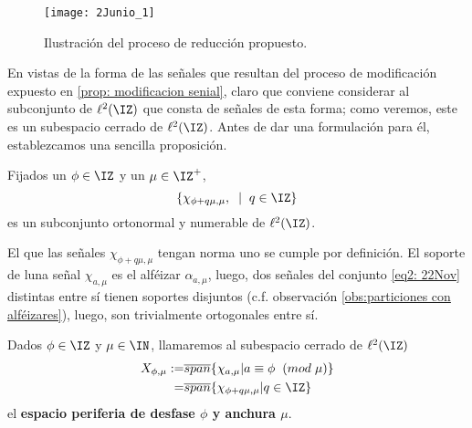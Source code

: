 \begin{figure}[H]
	\centering
	\texttt{[image: 2Junio\_1]}
	\caption{Ilustración del proceso de reducción propuesto.
	}
\end{figure}

En vistas de la forma de las señales
que resultan del proceso 
de modificación expuesto en 
\ref{prop: modificacion senial}, claro que conviene
considerar al subconjunto de $\ell^{2}(\IZ)$
que consta de señales de esta forma;
como veremos, 
este es un subespacio cerrado 
de $\ell^{2}(\IZ)$.
Antes de dar una formulación para él, establezcamos
una sencilla proposición.

\begin{prop}
\label{prop: las chi con dominio particion por ventanas forman un sist. ort.}
Fijados un 
$\phi \in \IZ$ y un 
$\mu \in \IZ^{+}$,
\begin{equation}
\label{eq2: 22Nov}
\{ \chi_{\phi + q\mu, \mu}, \hspace{0.2cm} | \hspace{0.2cm} 
q \in \IZ \}
\end{equation}
es un subconjunto ortonormal y numerable
de $\ell^{2}(\IZ)$.

\end{prop}
\begin{dem}
El que las señales $ \chi_{\phi + q\mu, \mu}$ tengan norma uno se 
cumple por definición. El soporte de luna señal
$\chi_{a, \mu}$ es el alféizar $\alpha_{a, \mu}$,
luego, dos señales del conjunto \eqref{eq2: 22Nov}
distintas entre sí tienen soportes disjuntos
(c.f. observación \ref{obs:particiones con alféizares}), 
luego, son trivialmente ortogonales entre sí.
 \QEDB
\end{dem} 


\begin{defi} 
Dados $\phi \in \IZ$ y $\mu \in \IN$,
llamaremos al subespacio cerrado de $\ell ^{2}(\IZ)$
\begin{align*}
X_{\phi, \mu } :=  &\overline{span} \{ \chi_{a, \mu} | a \equiv \phi
\hspace{0.2cm} (mod \hspace{0.1cm} \mu) \} \\
=  &\overline{span} \{ \chi_{\phi +q \mu, \mu} | q \in \IZ \} 
\end{align*}
el \textbf{espacio periferia de 
desfase $\phi$ y
anchura $\mu$}.
\end{defi}


